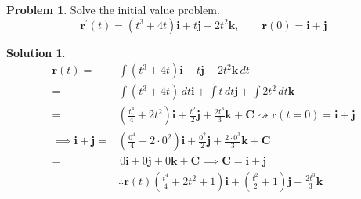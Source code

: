 \documentclass[10pt]{article}
\theoremstyle{definition}
\newtheorem{problem}{Problem}
\newtheorem{soln}{Solution}
\begin{document}
\begin{problem} Solve the initial value problem.
$$\mathbf{r}^\prime(t)=(t^3+4t)\mathbf{i}+t\mathbf{j}+2t^2\mathbf{k},\qquad\mathbf{r}(0)=\mathbf{i}+\mathbf{j}$$
\end{problem}
\begin{soln}
  \begin{align*}
    \mathbf{r}(t) = & \int (t^3+4t)\mathbf{i}+t\mathbf{j}+2t^2\mathbf{k} \,dt\\
    = & \int (t^3+4t)\,dt\mathbf{i}+\int t\,dt\mathbf{j}+\int 2t^2\,dt\mathbf{k} \\
    = & \left(\frac{t^4}{4}+2t^2\right)\mathbf{i}+\frac{t^2}{2}\mathbf{j}+\frac{2t^3}{3}\mathbf{k}+\mathbf{C}\rightsquigarrow \mathbf{r}(t=0)=\mathbf{i}+\mathbf{j}\\
    \implies \mathbf{i}+\mathbf{j} = & \left(\frac{0^4}{4}+2\cdot0^2\right)\mathbf{i}+\frac{0^2}{2}\mathbf{j}+\frac{2\cdot0^3}{3}\mathbf{k}+\mathbf{C} \\
    = & \,0\mathbf{i}+0\mathbf{j}+0\mathbf{k}+\mathbf{C}\implies\mathbf{C}=\mathbf{i}+\mathbf{j} \\
    &\therefore \mathbf{r}(t) \left(\frac{t^4}{4}+2t^2 + 1\right)\mathbf{i}+\left(\frac{t^2}{2}+1\right)\mathbf{j}+\frac{2t^3}{3}\mathbf{k}
  \end{align*}
\end{soln}
\end{document}
